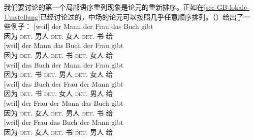 我们要讨论的第一个局部语序重列现象是论元的重新排序。正如在\ref{sec-GB-lokale-Umstellung}已经讨论过的，中场的论元可以按照几乎任意顺序排列。（）给出了一些例子：
\eal
\label{bsp-GPSG-anordnung}
\ex 
\gll {}[weil] der Mann der Frau das Buch gibt\\
     {}\spacebr{}因为 \textsc{det}.\nom{} 男人 \textsc{det}.\dat{} 女人 \textsc{det}.\acc{} 书 给\\
\ex 
\gll {}[weil] der Mann das Buch der Frau gibt\\
     {}\spacebr{}因为 \textsc{det}.\nom{} 男人 \textsc{det}.\acc{} 书 \textsc{det}.\dat{} 女人 给\\
\ex 
\gll {}[weil] das Buch der Mann der Frau gibt\\
{}\spacebr{}因为 \textsc{det}.\acc{} 书 \textsc{det}.\nom{} 男人 \textsc{det}.\dat{} 女人 给\\
\ex 
\gll {}[weil] das Buch der Frau der Mann gibt\\
{}\spacebr{}因为 \textsc{det}.\acc{} 书 \textsc{det}.\dat{} 女人 \textsc{det}.\nom{} 男人 给\\
\ex 
\gll {}[weil] der Frau der Mann das Buch gibt\\
{}\spacebr{}因为 \textsc{det}.\dat{} 女人 \textsc{det}.\nom{} 男人 \textsc{det}.\acc{} 书 给\\
\ex 
\gll {}[weil] der Frau das Buch der Mann gibt\\
{}\spacebr{}因为 \textsc{det}.\dat{} 女人 \textsc{det}.\acc{} 书 \textsc{det}.\nom{} 男人 给\\
\zl

